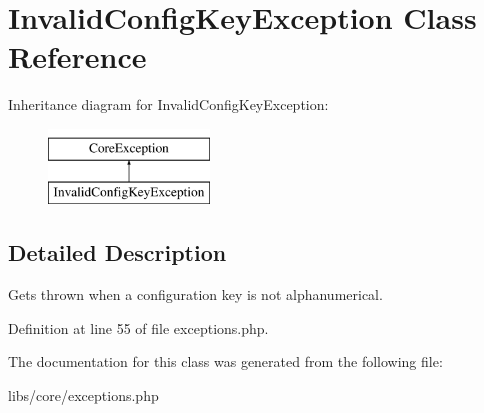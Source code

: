 \hypertarget{class_invalid_config_key_exception}{\section{\-Invalid\-Config\-Key\-Exception \-Class \-Reference}
\label{class_invalid_config_key_exception}
}
\-Inheritance diagram for \-Invalid\-Config\-Key\-Exception\-:\begin{figure}[H]
\begin{center}
\leavevmode
\includegraphics[height=2.000000cm]{class_invalid_config_key_exception}
\end{center}
\end{figure}


\subsection{\-Detailed \-Description}
\-Gets thrown when a configuration key is not alphanumerical. 

\-Definition at line 55 of file exceptions.\-php.



\-The documentation for this class was generated from the following file\-:\begin{DoxyCompactItemize}
\item 
libs/core/exceptions.\-php\end{DoxyCompactItemize}
